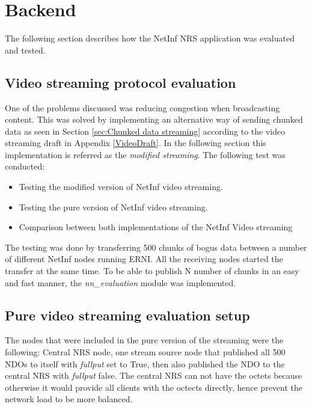 \section{Backend}

The following section describes how the NetInf NRS application was evaluated and tested. 

\subsection{Video streaming protocol evaluation}
One of the problems discussed was reducing congestion when broadcasting content. This was solved by implementing an alternative way of sending chunked data as seen in Section \ref{sec:Chunked data streaming} according to the video streaming draft in Appendix \ref{VideoDraft}. In the following section this implementation is referred as the \textit{modified streaming}. 
The following test was conducted:

\begin{itemize}
\item Testing the modified version of NetInf video streaming. 
\item Testing the pure version of NetInf video streaming.
\item Comparison between both implementations of the NetInf Video streaming
\end{itemize}

The testing was done by transferring 500 chunks of bogus data between a number of different NetInf nodes running ERNI. All the receiving nodes started the transfer at the same time. To be able to publish N number of chunks in an easy and fast manner, the \textit{nn\_evaluation} module was implemented.



\subsection{Pure video streaming evaluation setup}
The nodes that were included in the pure version of the streaming were the following:
Central NRS node, one stream source node that published all 500 NDOs to itself with \textit{fullput} set to True, then also published the NDO to the central NRS with \textit{fullput} false. The central NRS can not have the octets because otherwise it would provide all clients with the octects directly, hence prevent the network load to be more balanced.


